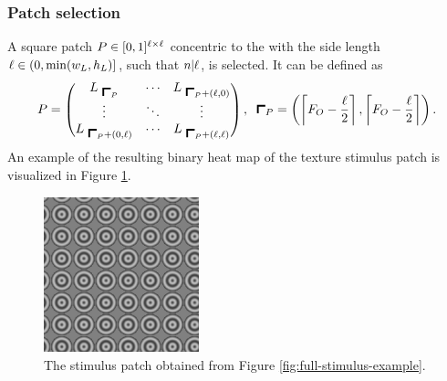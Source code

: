 \subsubsection{Patch selection}
\label{sec:patch-selection}

A square patch $P \in [0, 1]^{\ell \times \ell}$ concentric to the \stimfig{} with the side length $\ell \in (0, \min(w_L, h_L)]$,  such that $n | \ell$, is selected. It can be defined as
\begin{equation}
    \patchmatrix =
    \begin{pmatrix}
        \fullmatrix_{\ \patchstart} & \cdots  & \fullmatrix_{\ \patchstart + (\patchsize, 0)}  \\
        \vdots & \ddots & \vdots  \\
        \fullmatrix_{\ \patchstart + (0, \patchsize)} & \cdots  &  \fullmatrix_{\ \patchstart + (\patchsize, \patchsize)}
    \end{pmatrix}, \;\
    \patchstart = \left( \ceil{ \figcenter - \frac{\patchsize}{2}}, \ceil{  \figcenter - \frac{\patchsize}{2} } \right).
\end{equation}
An example of the resulting binary heat map of the texture stimulus patch is visualized in Figure \ref{fig:stim-patch-example}.

\begin{figure}
    \centering
    \includegraphics[width=0.4\textwidth]{src/assets/images/stimulus-patch.png}
    \caption[Stimulus patch]{The stimulus patch obtained from Figure \ref{fig:full-stimulus-example}.}
    \label{fig:stim-patch-example}
\end{figure}






